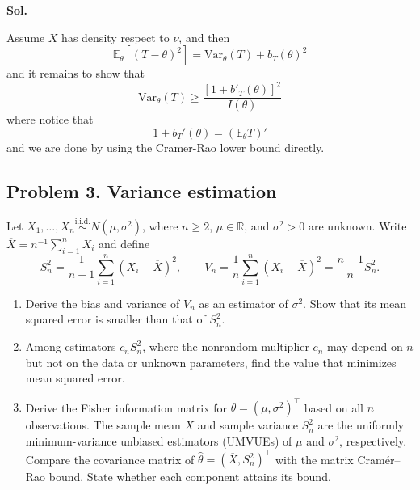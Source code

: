 \documentclass[lang=en,11pt,a4paper,citestyle=authoryear,nobib=true]{elegantpaper}
\newcommand{\R}{\mathbb{R}}
\begin{document}
\par\vspace{0.5em}\noindent\textbf{Sol.}\par
Assume $X$ has density respect to $\nu$, and then
\[
\mathbb E_{\theta}[(T-\theta)^2] = \text{Var}_{\theta}(T) + b_T(\theta)^2
\]
and it remains to show that
\[
\text{Var}_{\theta}(T) \geq \frac{[1+b'_T(\theta)]^2}{I(\theta)}
\]
where notice that
\[
1+b_T'(\theta) = (\mathbb E_{\theta}T)'
\]
and we are done by using the Cramer-Rao lower bound directly.
\vspace{3em}

\subsection*{Problem 3. Variance estimation}
Let $X_1,\ldots,X_n\overset{\mathrm{i.i.d.}}{\sim}N(\mu,\sigma^2)$,
where $n\ge 2$, $\mu\in\R$, and $\sigma^2>0$ are unknown.
Write $\overline X=n^{-1}\sum_{i=1}^n X_i$ and define
\[
S_n^2=\frac{1}{n-1}\sum_{i=1}^n(X_i-\overline X)^2,\qquad
V_n=\frac1n\sum_{i=1}^n(X_i-\overline X)^2=\frac{n-1}{n}S_n^2.
\]
\begin{enumerate}[label=(\roman*),leftmargin=*]
\item Derive the bias and variance of $V_n$ as an estimator of $\sigma^2$.
Show that its mean squared error is smaller than that of $S_n^2$.
\item Among estimators $c_nS_n^2$, where the nonrandom multiplier $c_n$
may depend on $n$ but not on the data or unknown parameters, find the value
that minimizes mean squared error.
\item Derive the Fisher information matrix for $\theta=(\mu,\sigma^2)^\top$
based on all $n$ observations. The sample mean $\overline X$ and sample
variance $S_n^2$ are the uniformly minimum-variance unbiased estimators
(UMVUEs) of $\mu$ and $\sigma^2$, respectively. Compare the covariance matrix
of $\widehat\theta=(\overline X,S_n^2)^\top$ with the matrix
Cram\'er--Rao bound. State whether each component attains its bound.
\end{enumerate}
\end{document}
